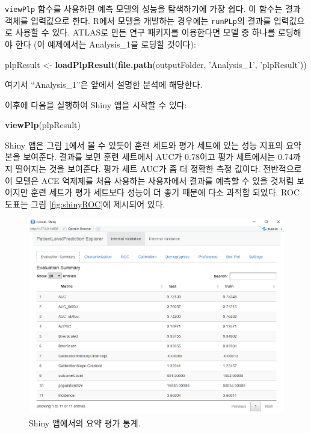 \documentclass[10.5pt]{book}
\newenvironment{Shaded}{\begin{snugshade}}{\end{snugshade}}
\newcommand{\KeywordTok}[1]{\textcolor[rgb]{0.13,0.29,0.53}{\textbf{#1}}}
\newcommand{\StringTok}[1]{\textcolor[rgb]{0.31,0.60,0.02}{#1}}
\newcommand{\NormalTok}[1]{#1}
\theoremstyle{definition}
\theoremstyle{definition}
\theoremstyle{definition}
\theoremstyle{remark}
\begin{document}
\texttt{viewPlp} 함수를 사용하면 예측 모델의 성능을 탐색하기에 가장
쉽다. 이 함수는 결과 객체를 입력값으로 한다. R에서 모델을 개발하는
경우에는 \texttt{runPLp}의 결과를 입력값으로 사용할 수 있다. ATLAS로
만든 연구 패키지를 이용한다면 모델 중 하나를 로딩해야 한다 (이
예제에서는 Analysis\_1을 로딩할 것이다): 

\begin{Shaded}
\begin{Highlighting}[]
\NormalTok{plpResult <-}\StringTok{ }\KeywordTok{loadPlpResult}\NormalTok{(}\KeywordTok{file.path}\NormalTok{(outputFolder, }
                                     \StringTok{'Analysis_1'}\NormalTok{, }
                                     \StringTok{'plpResult'}\NormalTok{))}
\end{Highlighting}
\end{Shaded}

여기서 ``Analysis\_1''은 앞에서 설명한 분석에 해당한다.

이후에 다음을 실행하여 Shiny 앱을 시작할 수 있다:

\begin{Shaded}
\begin{Highlighting}[]
\KeywordTok{viewPlp}\NormalTok{(plpResult)}
\end{Highlighting}
\end{Shaded}

Shiny 앱은 그림 \ref{fig:shinySummary}에서 볼 수 있듯이 훈련 세트와 평가
세트에 있는 성능 지표의 요약본을 보여준다. 결과를 보면 훈련 세트에서
AUC가 0.78이고 평가 세트에서는 0.74까지 떨어지는 것을 보여준다. 평가
세트 AUC가 좀 더 정확한 측정 값이다. 전반적으로 이 모델은 ACE 억제제를
처음 사용하는 사용자에서 결과를 예측할 수 있을 것처럼 보이지만 훈련
세트가 평가 세트보다 성능이 더 좋기 때문에 다소 과적합 되었다. ROC
도표는 그림 \ref{fig:shinyROC}에 제시되어 있다.

\begin{figure}
\includegraphics[width=1\linewidth]{images/PatientLevelPrediction/shinysummary} \caption{Shiny 앱에서의 요약 평가 통계.}\label{fig:shinySummary}
\end{figure}
\end{document}
